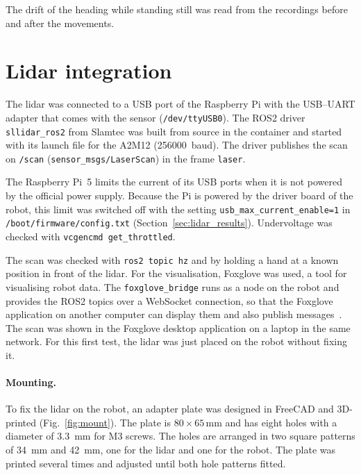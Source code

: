 The drift of the heading while standing still was read from the recordings before and after the movements.

\section{Lidar integration}
\label{sec:lidar_method}

The lidar was connected to a USB port of the Raspberry Pi with the USB--UART adapter that comes with the sensor (\texttt{/dev/ttyUSB0}). The ROS2 driver \texttt{sllidar\_ros2} from Slamtec was built from source in the container and started with its launch file for the A2M12 (\SI{256000}{baud}). The driver publishes the scan on \texttt{/scan} (\texttt{sensor\_msgs/LaserScan}) in the frame \texttt{laser}.

The Raspberry Pi~5 limits the current of its USB ports when it is not powered by the official power supply. Because the Pi is powered by the driver board of the robot, this limit was switched off with the setting \texttt{usb\_max\_current\_enable=1} in \texttt{/boot/firmware/config.txt} (Section~\ref{sec:lidar_results}). Undervoltage was checked with \texttt{vcgencmd get\_throttled}.

The scan was checked with \texttt{ros2 topic hz} and by holding a hand at a known position in front of the lidar. For the visualisation, Foxglove was used, a tool for visualising robot data. The \texttt{foxglove\_bridge} runs as a node on the robot and provides the ROS2 topics over a WebSocket connection, so that the Foxglove application on another computer can display them and also publish messages~\citep{foxglove_bridge}. The scan was shown in the Foxglove desktop application on a laptop in the same network. For this first test, the lidar was just placed on the robot without fixing it.

\paragraph{Mounting.} To fix the lidar on the robot, an adapter plate was designed in FreeCAD and 3D-printed (Fig.~\ref{fig:mount}). The plate is $80 \times 65$\,mm and has eight holes with a diameter of \SI{3.3}{\milli\metre} for M3 screws. The holes are arranged in two square patterns of \SI{34}{\milli\metre} and \SI{42}{\milli\metre}, one for the lidar and one for the robot. The plate was printed several times and adjusted until both hole patterns fitted. 

